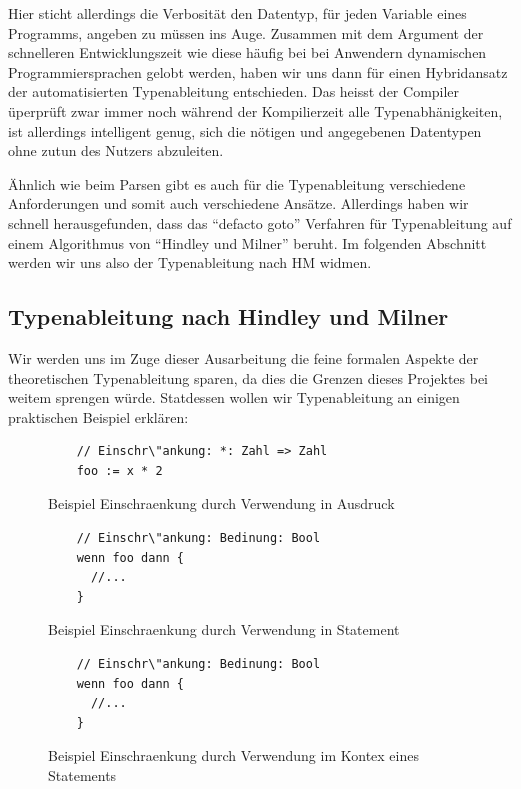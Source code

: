 \documentclass[a4paper, 12pt]{article}
\begin{document}
Hier sticht allerdings die Verbosit\"at den Datentyp, f\"ur jeden Variable eines
Programms, angeben zu m\"ussen ins Auge. Zusammen mit dem Argument der
schnelleren Entwicklungszeit wie diese h\"aufig bei bei Anwendern dynamischen Programmiersprachen gelobt werden, haben wir uns dann f\"ur einen Hybridansatz der automatisierten Typenableitung entschieden. Das heisst der Compiler \"uperpr\"uft
zwar immer noch w\"ahrend der Kompilierzeit alle Typenabh\"anigkeiten, ist allerdings intelligent genug, sich die n\"otigen und angegebenen Datentypen ohne
zutun des Nutzers abzuleiten.

\"Ahnlich wie beim Parsen gibt es auch f\"ur die Typenableitung verschiedene
Anforderungen und somit auch verschiedene Ans\"atze. Allerdings haben wir
schnell herausgefunden, dass das ``defacto goto'' Verfahren f\"ur Typenableitung
auf einem Algorithmus von “Hindley und Milner” beruht. Im folgenden Abschnitt werden wir uns also der Typenableitung nach HM widmen.

\subsection{Typenableitung nach Hindley und Milner}
Wir werden uns im Zuge dieser Ausarbeitung die feine formalen Aspekte der
theoretischen Typenableitung sparen, da dies die Grenzen dieses Projektes bei weitem sprengen w\"urde.
Statdessen wollen wir Typenableitung an einigen praktischen Beispiel
erkl\"aren:
\begin{figure}[h]
  \caption{Beispiel Einschraenkung durch Verwendung in Ausdruck}
  \begin{verbatim}
    // Einschr\"ankung: *: Zahl => Zahl
    foo := x * 2
  \end{verbatim}
\end{figure}

\begin{figure}[h]
  \caption{Beispiel Einschraenkung durch Verwendung in Statement}
  \begin{verbatim}
    // Einschr\"ankung: Bedinung: Bool
    wenn foo dann {
      //...
    }
  \end{verbatim}
\end{figure}

\begin{figure}[h]
  \caption{Beispiel Einschraenkung durch Verwendung im Kontex eines Statements}
  \begin{verbatim}
    // Einschr\"ankung: Bedinung: Bool
    wenn foo dann {
      //...
    }
  \end{verbatim}
\end{figure}
\end{document}
